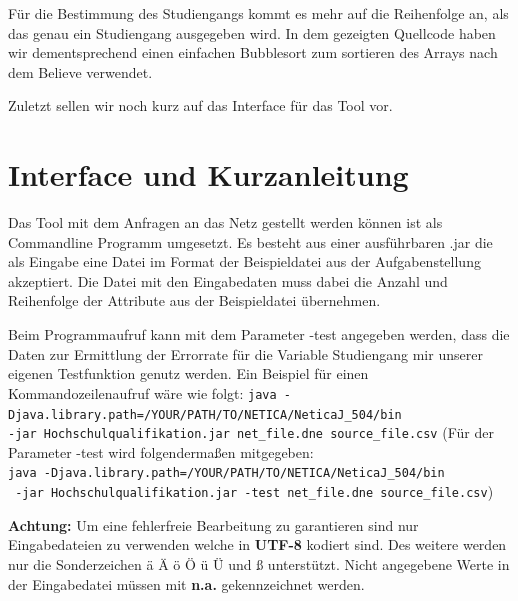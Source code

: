 Für die Bestimmung des Studiengangs kommt es mehr auf die Reihenfolge an, als das genau ein Studiengang ausgegeben wird. In dem gezeigten Quellcode haben wir dementsprechend einen einfachen Bubblesort zum sortieren des Arrays nach dem Believe verwendet.



Zuletzt sellen wir noch kurz auf das Interface für das Tool vor.

\section{Interface und Kurzanleitung}
Das Tool mit dem Anfragen an das Netz gestellt werden können ist als Commandline Programm umgesetzt. Es besteht aus einer ausführbaren .jar die als Eingabe eine Datei im Format der Beispieldatei aus der Aufgabenstellung akzeptiert. Die Datei mit den Eingabedaten muss dabei die Anzahl und Reihenfolge der Attribute aus der Beispieldatei übernehmen. 

Beim Programmaufruf kann mit dem Parameter -test angegeben werden, dass die Daten zur Ermittlung der Errorrate für die Variable Studiengang mir unserer eigenen Testfunktion genutz werden. Ein Beispiel für einen Kommandozeilenaufruf wäre wie folgt: \lstinline{java -Djava.library.path=/YOUR/PATH/TO/NETICA/NeticaJ_504/bin } \\ \lstinline{-jar Hochschulqualifikation.jar net_file.dne source_file.csv} (Für der Parameter -test wird folgendermaßen mitgegeben: \\ \lstinline{java -Djava.library.path=/YOUR/PATH/TO/NETICA/NeticaJ_504/bin} \\ \lstinline{ -jar Hochschulqualifikation.jar -test net_file.dne source_file.csv})

\textbf{Achtung:} Um eine fehlerfreie Bearbeitung zu garantieren sind nur Eingabedateien zu verwenden welche in \textbf{UTF-8} kodiert sind. Des weitere werden nur die Sonderzeichen ä Ä ö Ö ü Ü und ß unterstützt. Nicht angegebene Werte in der Eingabedatei müssen mit \textbf{\glqq n.a.\grqq} gekennzeichnet werden. 


\pagebreak